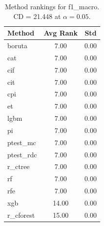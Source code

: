 \begin{table}[h]
\centering
\caption{Method rankings for f1_macro. CD = 21.448 at $\alpha=0.05$.}
\label{tab:ranks_f1_macro}
\begin{tabular}{lcc}
\toprule
Method & Avg Rank & Std \\
\midrule
boruta & 7.00 & 0.00 \\
cat & 7.00 & 0.00 \\
cif & 7.00 & 0.00 \\
cit & 7.00 & 0.00 \\
cpi & 7.00 & 0.00 \\
et & 7.00 & 0.00 \\
lgbm & 7.00 & 0.00 \\
pi & 7.00 & 0.00 \\
ptest_mc & 7.00 & 0.00 \\
ptest_rdc & 7.00 & 0.00 \\
r_ctree & 7.00 & 0.00 \\
rf & 7.00 & 0.00 \\
rfe & 7.00 & 0.00 \\
xgb & 14.00 & 0.00 \\
r_cforest & 15.00 & 0.00 \\
\bottomrule
\end{tabular}
\end{table}